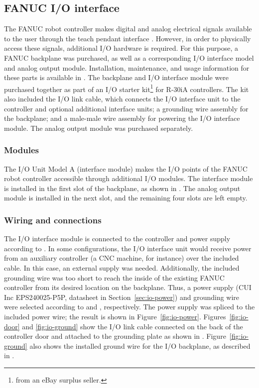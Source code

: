 \subsection{FANUC I/O interface}
\label{sec:io-interface}
The FANUC robot controller makes digital and analog electrical signals available to the user through the teach pendant interface \cite[sec~3.1.3]{lr-handling-tool}. However, in order to physically access these signals, additional I/O hardware is required. For this purpose, a FANUC backplane was purchased, as well as a corresponding I/O interface model and analog output module. Installation, maintenance, and usage information for these parts is available in \cite{io-unit}. The backplane and I/O interface module were purchased together as part of an I/O starter kit\footnote{from an eBay surplus seller.} for R-30iA controllers. The kit also included the I/O link cable, which connects the I/O interface unit to the controller and optional additional interface units; a grounding wire assembly for the backplane; and a male-male wire assembly for powering the I/O interface module. The analog output module was purchased separately. 

\subsubsection{Modules}
The I/O Unit Model A (interface module) makes the I/O points of the FANUC robot controller accessible through additional I/O modules. The interface module is installed in the first slot of the backplane, as shown in \cite[p~10]{io-unit}. The analog output module is installed in the next slot, and the remaining four slots are left empty.

\subsubsection{Wiring and connections}
The I/O interface module is connected to the controller and power supply according to \cite[ch~4]{io-unit}. In some configurations, the I/O interface unit would receive power from an auxiliary controller (a CNC machine, for instance) over the included cable. In this case, an external supply was needed. Additionally, the included grounding wire was too short to reach the inside of the existing FANUC controller from its desired location on the backplane. Thus, a power supply (CUI Inc EPS240025-P5P, datasheet in Section~\ref{sec:io-power}) and grounding wire were selected according to \cite[sec~4.2]{io-unit} and \cite[sec~4.3]{io-unit}, respectively. The power supply was spliced to the included power wire; the result is shown in Figure~\ref{fig:io-power}. Figures~\ref{fig:io-door} and \ref{fig:io-ground} show the I/O link cable connected on the back of the controller door and attached to the grounding plate as shown in \cite[Fig.3.2.2]{controller-maintenance}. Figure~\ref{fig:io-ground} also shows the installed ground wire for the I/O backplane, as described in \cite[sec~4.3]{io-unit}.

